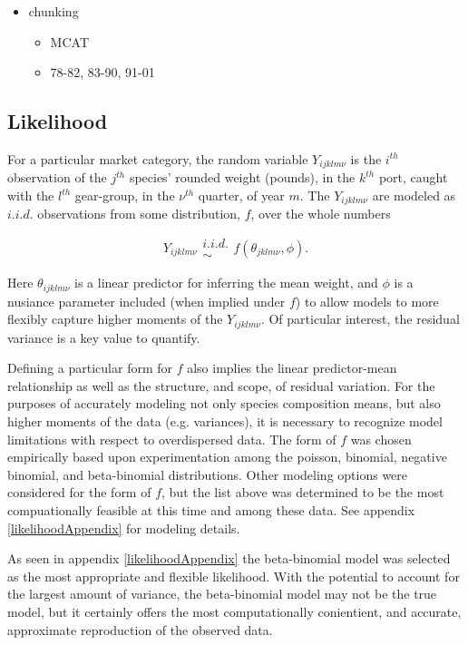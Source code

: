 \documentclass[12pt]{article}
\begin{document}
{\color{red}
\begin{itemize}
\item chunking
	\begin{itemize}
	\item MCAT
	\item 78-82, 83-90, 91-01
	\end{itemize}
\end{itemize}
}

%
%
\subsection{Likelihood}
%
%

%
For a particular market category, the random variable \(Y_{ijklm\nu}\) is the 
\(i^{th}\) observation of the \(j^{th}\) species' rounded weight (pounds), 
in the \(k^{th}\) port, caught with the \(l^{th}\) gear-group, in the \(\nu^{th}\) 
quarter, of year \(m\). The \(Y_{ijklm\nu}\) are modeled as $i.i.d.$ 
observations from some distribution, $f$, over the whole numbers

\begin{equation}
Y_{ijklm\nu} \substack{i.i.d.\\\sim} f(\theta_{jklm\nu}, \phi).
\label{generalLike}
\end{equation}

%
Here $\theta_{ijklm\nu}$ is a linear predictor for inferring the mean weight, 
and $\phi$ is a nusiance parameter included (when implied under $f$) to allow 
models to more flexibly capture higher moments of the \(Y_{ijklm\nu}\). Of 
particular interest, the residual variance is a key value to quantify.

%
Defining a particular form for $f$ also implies the linear predictor-mean 
relationship as well as the structure, and scope, of residual variation. For 
the purposes of accurately modeling not only species composition means, but 
also higher moments of the data (e.g. variances), it is necessary to recognize 
model limitations with respect to overdispersed data. The form of $f$ was 
chosen empirically based upon experimentation among the poisson, binomial, 
negative binomial, and beta-binomial distributions. Other modeling options 
were considered for the form of $f$, but the list above was determined to be 
the most compuationally feasible at this time and among these data. See 
{\color{red}appendix \ref{likelihoodAppendix}} for modeling details. 

% 
As seen in {\color{red}appendix \ref{likelihoodAppendix}} the beta-binomial model was 
selected as the most appropriate and flexible likelihood. With the potential 
to account for the largest amount of variance, the beta-binomial model may 
not be the true model, but it certainly offers the most computationally 
conientient, and accurate, approximate reproduction of the observed data. 
\end{document}
